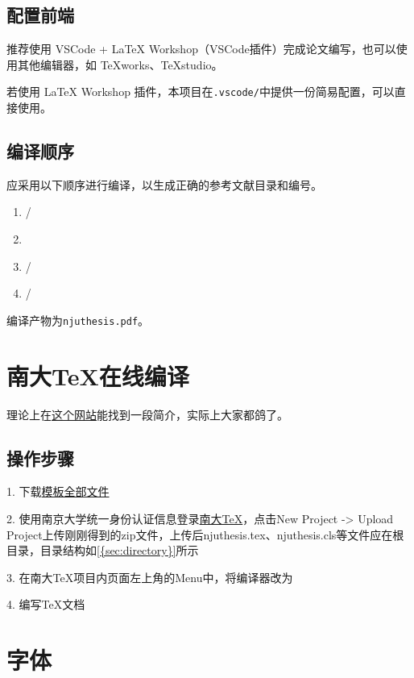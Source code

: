 \subsection{配置前端}

推荐使用 VSCode + LaTeX Workshop（VSCode插件）完成论文编写，也可以使用其他编辑器，如 TeXworks、TeXstudio。

若使用 LaTeX Workshop 插件，本项目在\lstinline|.vscode/|中提供一份简易配置，可以直接使用。

\subsection{编译顺序}
应采用以下顺序进行编译，以生成正确的参考文献目录和编号。
\begin{enumerate}
    \item {}/
    \item {}
    \item {}/
    \item {}/
\end{enumerate}

编译产物为\lstinline|njuthesis.pdf|。

\section{南大TeX在线编译}

理论上在\href{https://doc.nju.edu.cn/books/latex}{这个网站}能找到一段简介，实际上大家都鸽了。

\subsection{操作步骤}

1. 下载\href{https://github.com/nju-lug/NJUThesisUndergraduate/archive/refs/heads/master.zip}{模板全部文件}

2. 使用南京大学统一身份认证信息登录\href{https://tex.nju.edu.cn}{南大TeX}，点击New Project -> Upload Project上传刚刚得到的zip文件，上传后njuthesis.tex、njuthesis.cls等文件应在根目录，目录结构如\cref{{sec:directory}}所示

3. 在南大TeX项目内页面左上角的Menu中，将编译器改为

4. 编写TeX文档


\section{字体}

